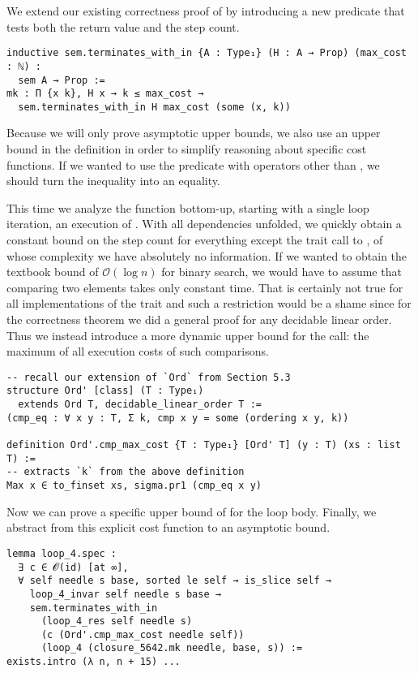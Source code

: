 We extend our existing correctness proof of  by introducing
a new predicate that tests both the return value and the step count.

\begin{verbatim}
inductive sem.terminates_with_in {A : Type₁} (H : A → Prop) (max_cost : ℕ) :
  sem A → Prop :=
mk : Π {x k}, H x → k ≤ max_cost →
  sem.terminates_with_in H max_cost (some (x, k))
\end{verbatim}

Because we will only prove asymptotic upper bounds, we also use an upper bound
in the definition in order to simplify reasoning about specific cost functions.
If we wanted to use the predicate with operators other than , we should turn the inequality
into an equality.

This time we analyze the function bottom-up, starting with a single loop iteration, \ie
an execution of . With all dependencies unfolded, we quickly obtain a
constant bound on the step count for everything except the trait call to
, of whose complexity we have absolutely no information. If we wanted
to obtain the textbook bound of $\mathcal{O}(\log n)$ for binary search, we would
have to assume that comparing two elements takes only constant time. That is
certainly not true for all implementations of the trait and such a
restriction would be a shame since for the correctness theorem we did a general proof for any
decidable linear order. Thus we instead introduce a more dynamic upper bound for
the call: the maximum of all execution costs of such comparisons.

\begin{verbatim}
-- recall our extension of `Ord` from Section 5.3
structure Ord' [class] (T : Type₁)
  extends Ord T, decidable_linear_order T :=
(cmp_eq : ∀ x y : T, Σ k, cmp x y = some (ordering x y, k))

definition Ord'.cmp_max_cost {T : Type₁} [Ord' T] (y : T) (xs : list T) :=
-- extracts `k` from the above definition
Max x ∈ to_finset xs, sigma.pr1 (cmp_eq x y)
\end{verbatim}

Now we can prove a specific upper bound of  for the loop body. Finally, we abstract from this explicit cost function
to an asymptotic bound.

\begin{verbatim}
lemma loop_4.spec :
  ∃ c ∈ 𝓞(id) [at ∞],
  ∀ self needle s base, sorted le self → is_slice self →
    loop_4_invar self needle s base →
    sem.terminates_with_in
      (loop_4_res self needle s)
      (c (Ord'.cmp_max_cost needle self))
      (loop_4 (closure_5642.mk needle, base, s)) :=
exists.intro (λ n, n + 15) ...
\end{verbatim}

